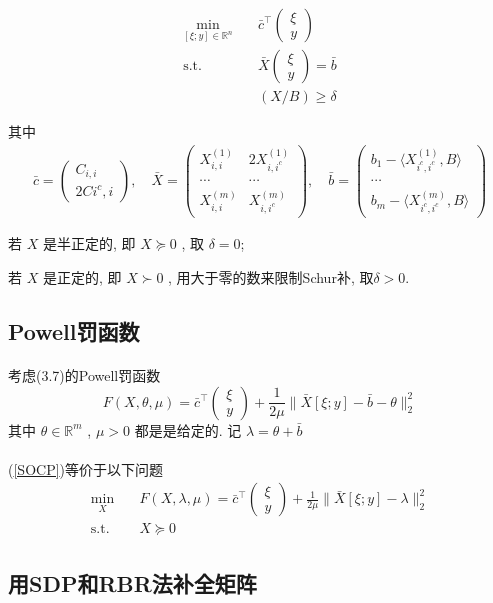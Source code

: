 \documentclass[UTF8]{ctexart}
\newcommand{\equSplit}[1]{\begin{equation}\begin{split}#1\end{split}\end{equation}}
\newcommand{\equ}[1]{\begin{equation}#1\end{equation}}
\newcommand{\Tst}{\text{s.t.}\quad}
\newcommand{\norm}[1]{\lVert#1\rVert}
\newcommand{\inprod}[1]{\langle#1\rangle}
\newcommand{\Real}[1]{\mathbb{R}^{#1}}
\newcommand{\pMa}[1]{\begin{pmatrix}#1\end{pmatrix}}
\numberwithin{equation}{section}
\begin{document}
			\equSplit{\label{SOCP}
				\min_{[\xi; y] \in \Real{n}} \quad
					& \bar{c}^\top \pMa{\xi \\ y}\\
				\Tst
					& \bar{X} \pMa{\xi \\ y} = \bar{b}\\
					& (X/B) \geq \delta
			}

			其中
			\equSplit{\label{SOCPCondition}
					\bar{c}
				=	\pMa{C_{i, i} \\ 2C{i^c, i}}, \quad
					\bar{X}
				=	\pMa{X^(1)_{i, i} & 2X^(1)_{i, i^c} \\ \cdots & \cdots \\ X^(m)_{i, i} & X^(m)_{i, i^c}}, \quad
					\bar{b}
				=	\pMa{b_1 - \inprod{X^(1)_{i^c, i^c}, B} \\ \cdots \\ b_m - \inprod{X^(m)_{i^c, i^c}, B}}
			}
			
			若 $X$ 是半正定的, 即 $X \succeq 0$ , 取 $\delta = 0$; 
			
			若 $X$ 是正定的, 即 $X \succ 0$ , 用大于零的数来限制Schur补, 取$\delta > 0$.

		\subsection{Powell罚函数}
			\paragraph{}
				\quad 考虑(3.7)的Powell罚函数
				\equ{\label{Powell}
						F(X, \theta, \mu)
					=	\bar{c}^\top \pMa{\xi \\ y} + \frac{1}{2\mu} \norm{\bar{X}[\xi; y] - \bar{b} - \theta}^2_2
				}
				其中 $\theta \in \Real{m}$ , $\mu > 0$ 都是是给定的. 记 $\lambda = \theta + \bar{b}$

			\paragraph{}
				\quad (\ref{SOCP})等价于以下问题
				\equSplit{\label{PowellQ}
					\min_{X} \quad
						& F(X, \lambda, \mu) = \bar{c}^\top \pMa{\xi \\ y} + \frac{1}{2\mu} \norm{\bar{X}[\xi; y] - \lambda}^2_2\\
					\Tst
						& X \succeq 0
				}

		\subsection{用SDP和RBR法补全矩阵}
\end{document}
